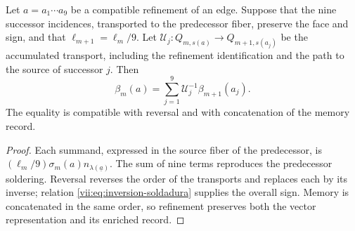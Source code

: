 \begin{proposition}
\label{vii:prop:refinamiento-soldadura}
Let \(a=a_1\cdots a_9\) be a compatible refinement of an edge.
Suppose that the nine successor incidences, transported to the predecessor fiber,
preserve the face and sign, and that
\(\ell_{m+1}=\ell_m/9\). Let
\(\mathcal U_j:Q_{m,s(a)}\longrightarrow Q_{m+1,s(a_j)}\)
be the accumulated transport, including the refinement identification
and the path to the source of successor \(j\). Then
\[
 \beta_m(a)=
 \sum_{j=1}^{9}\mathcal U_j^{-1}\beta_{m+1}(a_j).
\]
The equality is compatible with reversal and with concatenation
of the memory record.
\end{proposition}

\begin{proof}
Each summand, expressed in the source fiber of the predecessor, is
\((\ell_m/9)\sigma_m(a)n_{\lambda(\underline a)}\).
The sum of nine terms reproduces the predecessor soldering.
Reversal reverses the order of the transports and replaces each
by its inverse; relation \eqref{vii:eq:inversion-soldadura} supplies
the overall sign. Memory is concatenated in the same order, so
refinement preserves both the vector representation and its
enriched record.
\end{proof}
